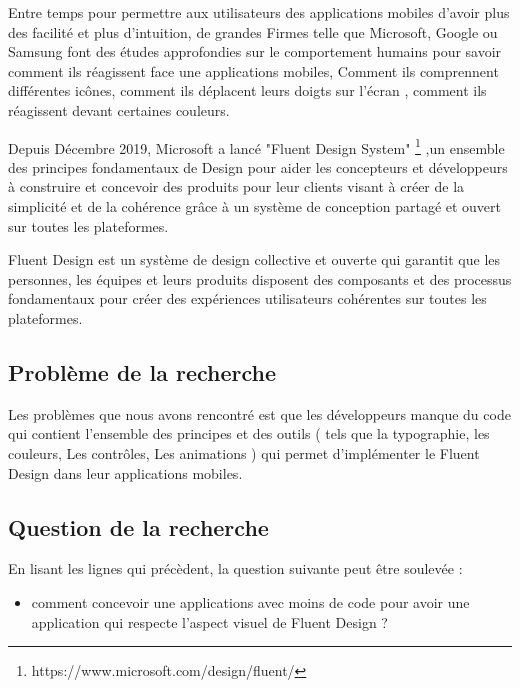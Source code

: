 \documentclass[a4paper,12pt]{report}
\begin{document}
                
                Entre temps pour permettre aux utilisateurs des applications mobiles d’avoir plus des facilité et plus 
                d'intuition, de grandes Firmes telle que Microsoft, Google ou Samsung font des études approfondies sur 
                le comportement humains pour savoir comment ils réagissent face une applications mobiles, 
                Comment ils comprennent différentes icônes, comment ils déplacent leurs doigts sur l'écran , 
                comment ils réagissent devant certaines couleurs.
        
                Depuis Décembre 2019, Microsoft a lancé "Fluent Design System" \footnote{https://www.microsoft.com/design/fluent/} ,un ensemble des principes fondamentaux 
                de Design pour aider les concepteurs et développeurs à construire et concevoir des produits 
                pour leur clients  visant à créer de la simplicité et de la cohérence grâce à un système de conception 
                partagé et ouvert sur toutes les plateformes.
        
                Fluent Design est un système de design collective et ouverte qui garantit que les personnes, 
                les équipes et leurs produits disposent des composants et des processus fondamentaux pour créer 
                des expériences utilisateurs cohérentes sur toutes les plateformes.
        
            \subsection*{Problème de la recherche}
                Les problèmes que nous avons rencontré est que les développeurs manque du code qui contient l’ensemble des
                 principes et des outils ( tels que la typographie, les couleurs, Les contrôles, Les animations )  
                 qui permet d'implémenter le Fluent Design dans leur applications mobiles.

            \subsection*{Question de la recherche}
                En lisant les lignes qui précèdent, la question suivante peut être soulevée :
                
                \begin{itemize}
                    \item comment concevoir une applications avec moins de code pour avoir une application 
                    qui respecte l'aspect visuel de Fluent Design ?
                \end{itemize}
        
\end{document}
